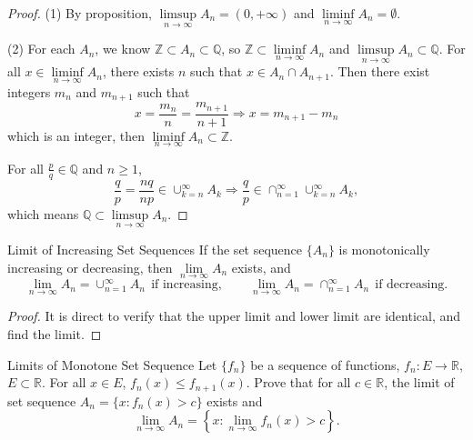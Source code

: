 \begin{proof}
  (1) By proposition, $\limsup \limits_{n \rightarrow \infty} A_n = (0, +\infty)$ and
  $\liminf \limits_{n \rightarrow \infty} A_n = \emptyset$.

  (2) For each $A_n$, we know $\mathbb{Z} \subset A_n \subset \mathbb{Q}$, so
  $\mathbb{Z} \subset \liminf \limits_{n \rightarrow \infty} A_n$ and
  $\limsup \limits_{n \rightarrow \infty} A_n \subset \mathbb{Q}$.
  For all $x \in \liminf \limits_{n \rightarrow \infty} A_n$, there exists $n$
  such that $x \in A_n \cap A_{n+1}$.
  Then there exist integers $m_n$ and $m_{n+1}$ such that
  \begin{equation}
    x = \frac{m_n}{n} = \frac{m_{n+1}}{n+1} \Rightarrow x = m_{n+1} - m_n
  \end{equation}
  which is an integer, then $\liminf \limits_{n \rightarrow \infty} A_n \subset \mathbb{Z}$.

  For all $\frac{p}{q} \in \mathbb{Q}$ and $n \geq 1$,
  \begin{equation}
    \frac{q}{p} = \frac{nq}{np} \in \cup _{k = n}^{\infty} A_k
    \Rightarrow
    \frac{q}{p} \in \cap _{n = 1}^{\infty} \cup _{k = n}^{\infty}A_k,
  \end{equation}
  which means $\mathbb{Q} \subset \limsup \limits_{n \rightarrow \infty}A_n$.
\end{proof}

\begin{proposition}{Limit of Increasing Set Sequences}{}
  If the set sequence $\{A_n\}$ is monotonically increasing or decreasing,
  then $\lim \limits _{n \rightarrow \infty} A_n$ exists, and
  \begin{equation}
    \lim \limits _{n \rightarrow \infty} A_n = \cup _{n = 1}^{\infty} A_n ~~  \text{if increasing},
    \quad \quad
    \lim \limits _{n \rightarrow \infty} A_n = \cap _{n = 1}^{\infty} A_n ~~  \text{if decreasing}.
  \end{equation}
\end{proposition}

\begin{proof}
  It is direct to verify that the upper limit and lower limit are identical,
  and find the limit.
\end{proof}

\begin{example}{Limits of Monotone Set Sequence}{}
  Let $\{f_n\}$ be a sequence of functions, $f_n : E \rightarrow \mathbb{R}$, $E \subset \mathbb{R}$.
  For all $x \in E$, $f_n(x) \leq f_{n+1}(x)$. Prove that for all $c \in \mathbb{R}$,
  the limit of set sequence $A_n = \{x: f_n(x) > c\}$ exists and 
  \begin{equation}
    \lim \limits _{n \rightarrow \infty} A_n = \left\{ x:\lim \limits _{n \rightarrow \infty} f_n(x) > c \right\}.
  \end{equation}
\end{example}

